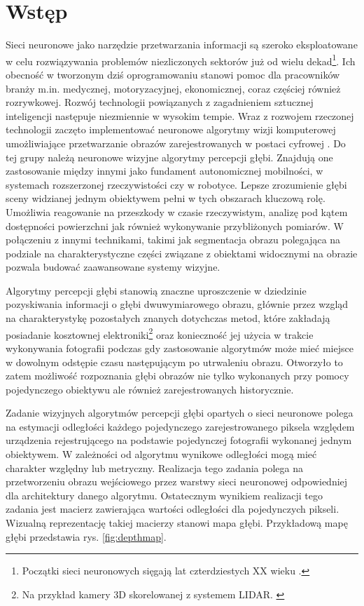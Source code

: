 \chapter{Wstęp}\label{chap:wstęp}

Sieci neuronowe jako narzędzie przetwarzania informacji są szeroko eksploatowane w celu rozwiązywania problemów niezliczonych sektorów już od wielu dekad\footnote{Początki sieci neuronowych sięgają lat czterdziestych XX wieku \cite{mccullochpitts1943}.}. Ich obecność w tworzonym dziś oprogramowaniu stanowi pomoc dla pracowników branży m.in. medycznej, motoryzacyjnej, ekonomicznej, coraz częściej również rozrywkowej. Rozwój technologii powiązanych z zagadnieniem sztucznej inteligencji następuje niezmiennie w wysokim tempie. Wraz z rozwojem rzeczonej technologii zaczęto implementować neuronowe algorytmy wizji komputerowej umożliwiające przetwarzanie obrazów zarejestrowanych w postaci cyfrowej \cite{tadeusiewiczflasinski1991}. Do tej grupy należą neuronowe wizyjne algorytmy percepcji głębi. Znajdują one zastosowanie między innymi jako fundament autonomicznej mobilności, w systemach rozszerzonej rzeczywistości czy w robotyce. Lepsze zrozumienie głębi sceny widzianej jednym obiektywem pełni w tych obszarach kluczową rolę. Umożliwia reagowanie na przeszkody w czasie rzeczywistym, analizę pod kątem dostępności powierzchni jak również wykonywanie przybliżonych pomiarów. W połączeniu z innymi technikami, takimi jak segmentacja obrazu \cite{minaee2021} polegająca na podziale na charakterystyczne części związane z obiektami widocznymi na obrazie pozwala budować zaawansowane systemy wizyjne.

Algorytmy percepcji głębi stanowią znaczne uproszczenie w dziedzinie pozyskiwania informacji o głębi dwuwymiarowego obrazu, głównie przez wzgląd na charakterystykę pozostałych znanych dotychczas metod, które zakładają posiadanie kosztownej elektroniki\footnote{Na przykład kamery 3D skorelowanej z systemem LIDAR. \cite{dubik1989}} oraz konieczność jej użycia w trakcie wykonywania fotografii podczas gdy zastosowanie algorytmów może mieć miejsce w dowolnym odstępie czasu następującym po utrwaleniu obrazu. Otworzyło to zatem możliwość rozpoznania głębi obrazów nie tylko wykonanych przy pomocy pojedynczego obiektywu ale również zarejestrowanych historycznie.

Zadanie wizyjnych algorytmów percepcji głębi opartych o sieci neuronowe polega na estymacji odległości każdego pojedynczego zarejestrowanego piksela względem urządzenia rejestrującego na podstawie pojedynczej fotografii wykonanej jednym obiektywem. W zależności od algorytmu wynikowe odległości mogą mieć charakter względny lub metryczny. Realizacja tego zadania polega na przetworzeniu obrazu wejściowego przez warstwy sieci neuronowej odpowiedniej dla architektury danego algorytmu. Ostatecznym wynikiem realizacji tego zadania jest macierz zawierająca wartości odległości dla pojedynczych pikseli. Wizualną reprezentację takiej macierzy stanowi mapa głębi. Przykładową mapę głębi przedstawia rys. \ref{fig:depthmap}.

